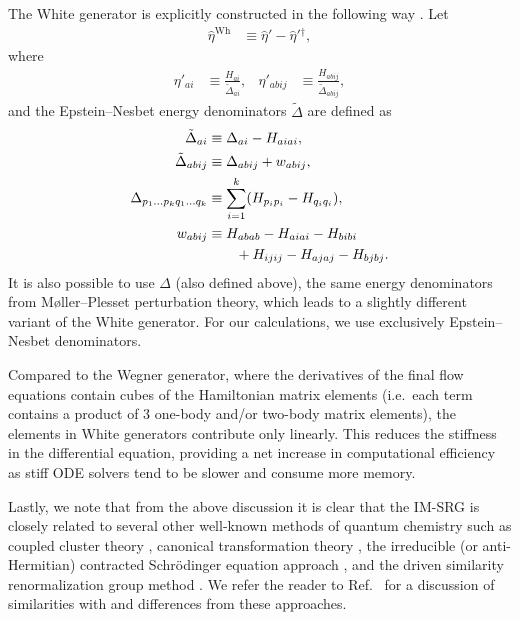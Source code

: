 \documentclass[aip, jcp, 12pt]{revtex4-1}
\begin{document}
The White generator is explicitly constructed in the following way \cite{PhysRevLett.106.222502,White:cond-mat0201346}.  Let
\begin{align*}
\hat{\eta}^{\text{Wh}} &\equiv \hat{\eta}' - \hat{\eta}'{}^\dagger,
\end{align*}
where
\begin{align*}
\eta'_{a i} &\equiv \frac{H_{a i}}{\tilde{\Delta}_{a i}}, &
\eta'_{a b i j} &\equiv \frac{H_{a b i j}}{\tilde{\Delta}_{a b i j}},
\end{align*}
and the Epstein--Nesbet energy denominators $\tilde{\Delta}$ \cite{shavitt2009many} are defined as
\begin{align}
\tilde{\Delta}_{a i} &\equiv \Delta_{a i} - H_{a i a i}, \notag \\
\tilde{\Delta}_{a b i j} &\equiv \Delta_{a b i j} + w_{a b i j}, \notag \\
\Delta_{p_1 \ldots p_k q_1 \ldots q_k} &\equiv \sum_{i = 1}^k (H_{p_i p_i} -  H_{q_i q_i}), \label{eq:moellerplessetdenominator} \\
w_{a b i j}
  &\equiv H_{a b a b} - H_{a i a i} - H_{b i b i} \notag \\
  &\qquad + H_{i j i j} - H_{a j a j} - H_{b j b j}. \notag
\end{align}
It is also possible \cite{IMSRG} to use $\Delta$ (also defined above), the same energy denominators from M\o ller--Plesset perturbation theory, which leads to a slightly different variant of the White generator.  For our calculations, we use exclusively Epstein--Nesbet denominators.

Compared to the Wegner generator, where the derivatives of the final flow equations contain cubes of the Hamiltonian matrix elements (i.e.\ each term contains a product of 3 one-body and/or two-body matrix elements), the elements in White generators contribute only linearly.  This reduces the stiffness in the differential equation, providing a net increase in computational efficiency as stiff ODE solvers tend to be slower and consume more memory.

Lastly, we note that from the above discussion it is clear that the IM-SRG is closely related to several other well-known methods of quantum chemistry such as coupled cluster theory \cite{shavitt2009many}, canonical transformation theory \cite{White:cond-mat0201346,CTreview}, the irreducible (or anti-Hermitian) contracted Schr\"odinger equation approach \cite{Mazzioti1,Mazzioti2}, and the driven similarity renormalization group method \cite{Evangelista}.  We refer the reader to Ref.\ \cite{HeikoReview} for a discussion of similarities with and differences from these approaches.
\end{document}
